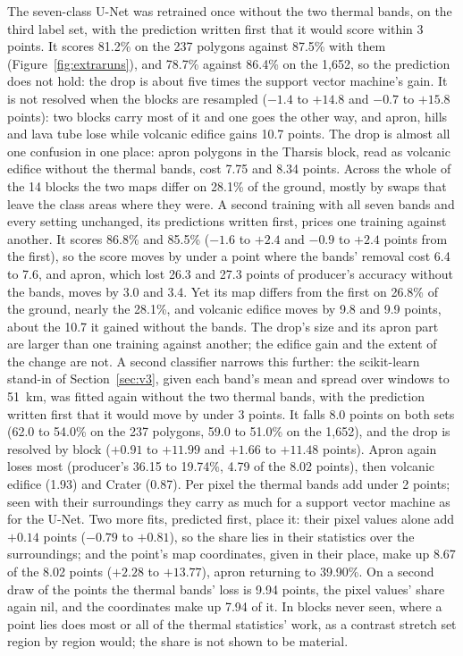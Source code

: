 \documentclass[twocolumn]{aastex701}
\begin{document}
The seven-class U-Net was retrained once without the two thermal bands, on the third label set, with the prediction
written first that it would score within 3 points. It scores 81.2\% on the 237 polygons against 87.5\% with them (Figure~\ref{fig:extraruns}), and
78.7\% against 86.4\% on the 1,652, so the prediction does not hold: the drop is about five times the support vector
machine's gain. It is not resolved when the blocks are resampled ($-1.4$ to $+14.8$ and $-0.7$ to $+15.8$ points): two
blocks carry most of it and one goes the other way, and apron, hills and lava tube lose while volcanic edifice gains
10.7 points. The drop is almost all one confusion in one place: apron polygons in the Tharsis block, read as volcanic
edifice without the thermal bands, cost 7.75 and 8.34 points. Across the whole of the 14 blocks the two maps differ
on 28.1\% of the ground, mostly by swaps that leave the class areas where they were. A second training with all
seven bands and every setting unchanged, its predictions written first, prices one training against another. It
scores 86.8\% and 85.5\% ($-1.6$ to $+2.4$ and $-0.9$ to $+2.4$ points from the first), so the score moves by under
a point where the bands' removal cost 6.4 to 7.6, and apron, which lost 26.3 and 27.3 points of producer's accuracy
without the bands, moves by 3.0 and 3.4. Yet its map differs from the first on 26.8\% of the ground, nearly the
28.1\%, and volcanic edifice moves by 9.8 and 9.9 points, about the 10.7 it gained without the bands. The drop's size
and its apron part are larger than one training against another; the edifice gain and the extent of the change are
not. %
A second classifier narrows this further: the scikit-learn stand-in of Section~\ref{sec:v3}, given each band's mean and spread over windows to 51~km, was
fitted again without the two thermal bands, with the prediction written first that it would move by under 3 points. It
falls 8.0 points on both sets (62.0 to 54.0\% on the 237 polygons, 59.0 to 51.0\% on the 1,652), and the drop
is resolved by block ($+0.91$ to $+11.99$ and $+1.66$ to $+11.48$ points). Apron again loses most (producer's 36.15 to
19.74\%, 4.79 of the 8.02 points), then volcanic edifice (1.93) and Crater (0.87). Per pixel the thermal bands add under
2 points; seen with their surroundings they carry as much for a support vector machine as for the U-Net. Two more
fits, predicted first, place it: their pixel values alone add $+0.14$ points ($-0.79$ to $+0.81$), so
the share lies in their statistics over the surroundings; and the point's map coordinates, given in their place,
make up 8.67 of the 8.02 points ($+2.28$ to $+13.77$), apron returning to 39.90\%. On a second draw of the points the
thermal bands' loss is 9.94 points, the pixel values' share again nil, and the coordinates make up 7.94 of it.
In blocks never seen, where a point lies does most or all of the thermal statistics' work, as a contrast
stretch set region by region would; the share is not shown to be material. %
\end{document}

